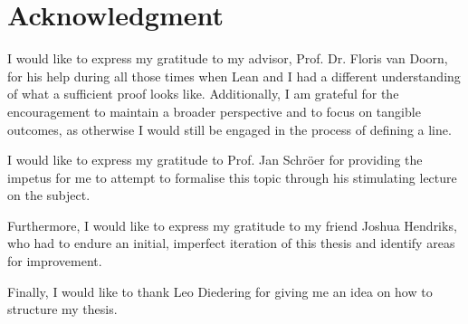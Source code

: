 \section*{Acknowledgment}
I would like to express my gratitude to my advisor, Prof. Dr. Floris van Doorn, for his help during all those times when Lean and I had a different understanding of what a sufficient proof looks like.
Additionally, I am grateful for the encouragement to maintain a broader perspective and to focus on tangible outcomes, as otherwise I would still be engaged in the process of defining a line.

I would like to express my gratitude to Prof. Jan Schröer for providing the impetus for me to attempt to formalise this topic through his stimulating lecture on the subject.

Furthermore, I would like to express my gratitude to my friend Joshua Hendriks, who had to endure an initial, imperfect iteration of this thesis and identify areas for improvement. 

Finally, I would like to thank Leo Diedering for giving me an idea on how to structure my thesis.